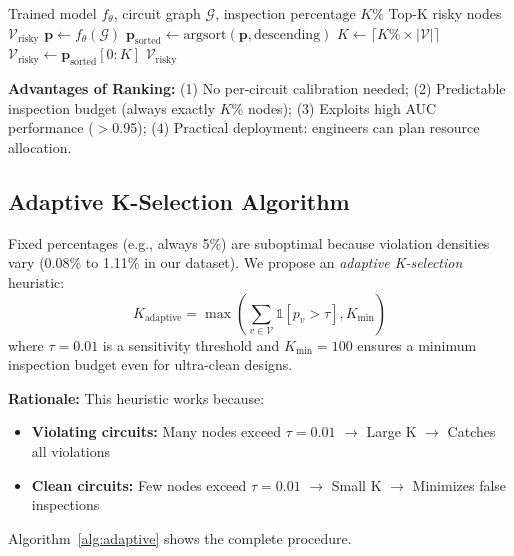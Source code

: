 \documentclass[10pt,twocolumn,journal]{IEEEtran}
\begin{document}
\begin{algorithm}[t]
\caption{Rank-Based Timing Violation Prediction}
\label{alg:ranking}
\begin{algorithmic}[1]
\REQUIRE Trained model $f_\theta$, circuit graph $\mathcal{G}$, inspection percentage $K\%$
\ENSURE Top-K risky nodes $\mathcal{V}_{\text{risky}}$
\STATE $\mathbf{p} \leftarrow f_\theta(\mathcal{G})$ 
\STATE $\mathbf{p}_{\text{sorted}} \leftarrow \text{argsort}(\mathbf{p}, \text{descending})$ 
\STATE $K \leftarrow \lceil K\% \times |\mathcal{V}| \rceil$
\STATE $\mathcal{V}_{\text{risky}} \leftarrow \mathbf{p}_{\text{sorted}}[0:K]$
\RETURN $\mathcal{V}_{\text{risky}}$
\end{algorithmic}
\end{algorithm}

\textbf{Advantages of Ranking:}
(1) No per-circuit calibration needed;
(2) Predictable inspection budget (always exactly $K$\% nodes);
(3) Exploits high AUC performance ($>$0.95);
(4) Practical deployment: engineers can plan resource allocation.

\subsection{Adaptive K-Selection Algorithm}

Fixed percentages (e.g., always 5\%) are suboptimal because violation densities vary (0.08\% to 1.11\% in our dataset). We propose an \textit{adaptive K-selection} heuristic:
\begin{equation}
K_{\text{adaptive}} = \max\left( \sum_{v \in \mathcal{V}} \mathbb{1}[p_v > \tau], K_{\text{min}} \right)
\label{eq:adaptive_k}
\end{equation}
where $\tau = 0.01$ is a sensitivity threshold and $K_{\text{min}} = 100$ ensures a minimum inspection budget even for ultra-clean designs.

\textbf{Rationale:} This heuristic works because:
\begin{itemize}
    \item \textbf{Violating circuits:} Many nodes exceed $\tau = 0.01$ $\rightarrow$ Large K $\rightarrow$ Catches all violations
    \item \textbf{Clean circuits:} Few nodes exceed $\tau = 0.01$ $\rightarrow$ Small K $\rightarrow$ Minimizes false inspections
\end{itemize}

Algorithm~\ref{alg:adaptive} shows the complete procedure.
\end{document}
